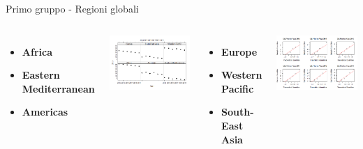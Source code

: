\documentclass{beamer}
\begin{document}
\begin{frame}{Primo gruppo - Regioni globali}
	\begin{columns}
			\begin{itemize}
				\item \textbf{Africa}
				\item \textbf{Eastern Mediterranean}
				\item \textbf{Americas}
			\end{itemize}
			\bigskip
			\includegraphics[width=\linewidth]{Images/5 - Firstgroup.png}
			\begin{itemize}
				\item \textbf{Europe}
				\item \textbf{Western Pacific}
				\item \textbf{South-East Asia}
			\end{itemize}
			\bigskip
			\includegraphics[width=\linewidth]{Images/6 - Firstqq.png}
	\end{columns}
\end{frame}
\end{document}
